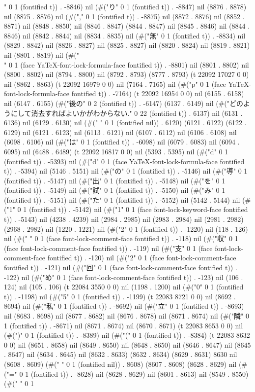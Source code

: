 " 0 1 (fontified t)) . -8846) nil (#("り" 0 1 (fontified t)) . -8847) nil (8876 . 8878) nil (8875 . 8876) nil (#("," 0 1 (fontified t)) . -8875) nil (8872 . 8876) nil (8852 . 8871) nil (8848 . 8850) nil (8846 . 8847) (8844 . 8847) nil (8845 . 8846) nil (8844 . 8846) nil (8842 . 8844) nil (8834 . 8835) nil (#("無" 0 1 (fontified t)) . -8834) nil (8829 . 8842) nil (8826 . 8827) nil (8825 . 8827) nil (8820 . 8824) nil (8819 . 8821) nil (8801 . 8819) nil (#("\\" 0 1 (face YaTeX-font-lock-formula-face fontified t)) . -8801) nil (8801 . 8802) nil (8800 . 8802) nil (8794 . 8800) nil (8792 . 8793) (8777 . 8793) (t 22092 17027 0 0) nil (8862 . 8863) (t 22092 16979 0 0) nil (7164 . 7165) nil (#("p" 0 1 (face YaTeX-font-lock-formula-face fontified t)) . -7164) (t 22092 16954 0 0) nil (6155 . 6158) nil (6147 . 6155) (#("後の" 0 2 (fontified t)) . -6147) (6137 . 6149) nil (#("どのようにして消去すればよいかがわからない." 0 22 (fontified t)) . 6137) nil (6131 . 6136) nil (6129 . 6130) nil (#(" " 0 1 (fontified nil)) . 6120) (6121 . 6122) (6122 . 6129) nil (6121 . 6123) nil (6113 . 6121) nil (6107 . 6112) nil (6106 . 6108) nil (6098 . 6106) nil (#("は" 0 1 (fontified t)) . -6098) nil (6079 . 6083) nil (6094 . 6095) nil (6488 . 6489) (t 22092 16817 0 0) nil (5393 . 5395) nil (#("d" 0 1 (fontified t)) . -5393) nil (#("d" 0 1 (face YaTeX-font-lock-formula-face fontified t)) . -5394) nil (5146 . 5151) nil (#("の" 0 1 (fontified t)) . -5146) nil (#("導" 0 1 (fontified t)) . -5147) nil (#("出" 0 1 (fontified t)) . -5148) nil (#("を" 0 1 (fontified t)) . -5149) nil (#("試" 0 1 (fontified t)) . -5150) nil (#("み" 0 1 (fontified t)) . -5151) nil (#("た" 0 1 (fontified t)) . -5152) nil (5142 . 5144) nil (#("1" 0 1 (fontified t)) . -5142) nil (#("1" 0 1 (face font-lock-keyword-face fontified t)) . -5143) nil (4238 . 4239) nil (2984 . 2985) nil (2983 . 2984) nil (2981 . 2982) (2968 . 2982) nil (1220 . 1221) nil (#("2" 0 1 (fontified t)) . -1220) nil (118 . 126) nil (#(" " 0 1 (face font-lock-comment-face fontified t)) . -118) nil (#("収" 0 1 (face font-lock-comment-face fontified t)) . -119) nil (#("支" 0 1 (face font-lock-comment-face fontified t)) . -120) nil (#("2" 0 1 (face font-lock-comment-face fontified t)) . -121) nil (#("回" 0 1 (face font-lock-comment-face fontified t)) . -122) nil (#("め" 0 1 (face font-lock-comment-face fontified t)) . -123) nil (106 . 124) nil (105 . 106) (t 22084 3550 0 0) nil (1198 . 1200) nil (#("0" 0 1 (fontified t)) . -1198) nil (#("5" 0 1 (fontified t)) . -1199) (t 22083 8721 0 0) nil (8692 . 8694) nil (#("私" 0 1 (fontified t)) . -8692) nil (#("立" 0 1 (fontified t)) . -8693) nil (8683 . 8698) nil (8677 . 8682) nil (8676 . 8678) nil (8671 . 8674) nil (#("隣" 0 1 (fontified t)) . -8671) nil (8671 . 8674) nil (8670 . 8671) (t 22083 8653 0 0) nil (#(")" 0 1 (fontified t)) . -8389) nil (#("(" 0 1 (fontified t)) . -8384) (t 22083 8632 0 0) nil (8651 . 8658) nil (8649 . 8650) nil (8648 . 8650) nil (8646 . 8647) nil (8645 . 8647) nil (8634 . 8645) nil (8632 . 8633) (8632 . 8634) (8629 . 8631) 8630 nil (8608 . 8609) (#(" " 0 1 (fontified nil)) . 8608) (8607 . 8608) (8628 . 8629) nil (#("=" 0 1 (fontified t)) . -8628) nil (8628 . 8629) nil (8601 . 8613) nil (8549 . 8550) (#(" " 0 1 